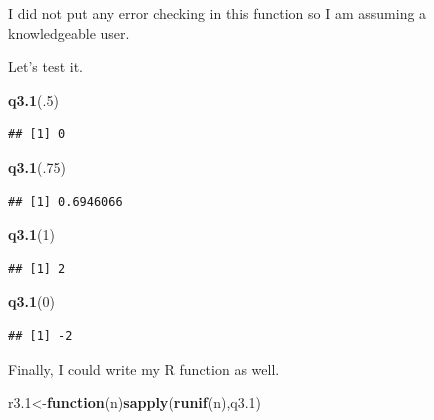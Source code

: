 \documentclass[]{book}
\newenvironment{Shaded}{\begin{snugshade}}{\end{snugshade}}
\newcommand{\KeywordTok}[1]{\textcolor[rgb]{0.13,0.29,0.53}{\textbf{#1}}}
\newcommand{\DecValTok}[1]{\textcolor[rgb]{0.00,0.00,0.81}{#1}}
\newcommand{\ControlFlowTok}[1]{\textcolor[rgb]{0.13,0.29,0.53}{\textbf{#1}}}
\newcommand{\NormalTok}[1]{#1}
\theoremstyle{definition}
\theoremstyle{definition}
\theoremstyle{definition}
\theoremstyle{remark}
\begin{document}
I did not put any error checking in this function so I am assuming a
knowledgeable user.

Let's test it.

\begin{Shaded}
\begin{Highlighting}[]
\KeywordTok{q3.1}\NormalTok{(.}\DecValTok{5}\NormalTok{)}
\end{Highlighting}
\end{Shaded}

\begin{verbatim}
## [1] 0
\end{verbatim}

\begin{Shaded}
\begin{Highlighting}[]
\KeywordTok{q3.1}\NormalTok{(.}\DecValTok{75}\NormalTok{)}
\end{Highlighting}
\end{Shaded}

\begin{verbatim}
## [1] 0.6946066
\end{verbatim}

\begin{Shaded}
\begin{Highlighting}[]
\KeywordTok{q3.1}\NormalTok{(}\DecValTok{1}\NormalTok{)}
\end{Highlighting}
\end{Shaded}

\begin{verbatim}
## [1] 2
\end{verbatim}

\begin{Shaded}
\begin{Highlighting}[]
\KeywordTok{q3.1}\NormalTok{(}\DecValTok{0}\NormalTok{)}
\end{Highlighting}
\end{Shaded}

\begin{verbatim}
## [1] -2
\end{verbatim}

Finally, I could write my R function as well.

\begin{Shaded}
\begin{Highlighting}[]
\NormalTok{r3.}\DecValTok{1}\NormalTok{<-}\ControlFlowTok{function}\NormalTok{(n)}\KeywordTok{sapply}\NormalTok{(}\KeywordTok{runif}\NormalTok{(n),q3.}\DecValTok{1}\NormalTok{)}
\end{Highlighting}
\end{Shaded}
\end{document}
